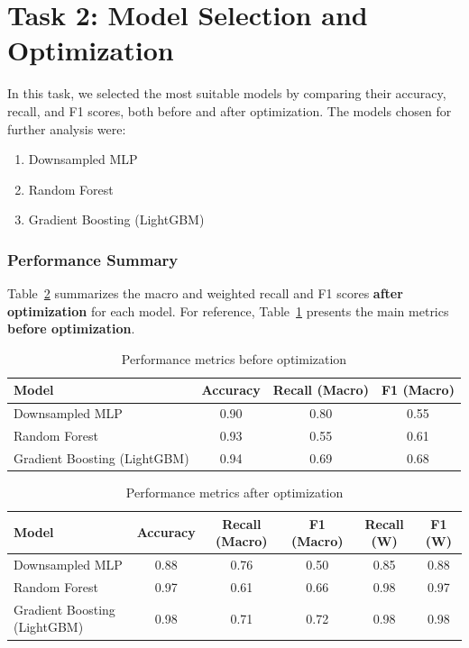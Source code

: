 \documentclass[a4paper,12pt]{article}
\begin{document}
\section*{Task 2: Model Selection and Optimization}

In this task, we selected the most suitable models by comparing their accuracy, recall, and F1 scores, both before and after optimization. The models chosen for further analysis were:

\begin{enumerate}
    \item Downsampled MLP
    \item Random Forest
    \item Gradient Boosting (LightGBM)
\end{enumerate}

\subsubsection*{Performance Summary}

Table~\ref{tab:model_results} summarizes the macro and weighted recall and F1 scores \textbf{after optimization} for each model. For reference, Table~\ref{tab:model_preopt} presents the main metrics \textbf{before optimization}.

\begin{table}[h!]
    \centering
    \caption{Performance metrics before optimization}
    \label{tab:model_preopt}
    \begin{tabular}{lccc}
        \toprule
        \textbf{Model} & \textbf{Accuracy} & \textbf{Recall (Macro)} & \textbf{F1 (Macro)} \\
        \midrule
        Downsampled MLP & 0.90 & 0.80 & 0.55 \\
        Random Forest & 0.93 & 0.55 & 0.61 \\
        Gradient Boosting (LightGBM) & 0.94 & 0.69 & 0.68 \\
        \bottomrule
    \end{tabular}
\end{table}

\begin{table}[h!]
    \centering
    \caption{Performance metrics after optimization}
    \label{tab:model_results}
    \begin{tabular}{lccccc}
        \toprule
        \textbf{Model} & \textbf{Accuracy} & \textbf{Recall (Macro)} & \textbf{F1 (Macro)} & \textbf{Recall (W)} & \textbf{F1 (W)} \\
        \midrule
        Downsampled MLP & 0.88 & 0.76 & 0.50 & 0.85 & 0.88 \\ 
        Random Forest & 0.97 & 0.61 & 0.66 & 0.98 & 0.97 \\
        Gradient Boosting (LightGBM) & 0.98 & 0.71 & 0.72 & 0.98 & 0.98 \\
        \bottomrule
    \end{tabular}
\end{table}
\end{document}
